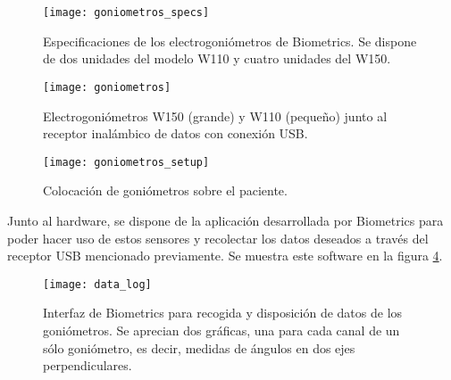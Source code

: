 \begin{figure}[!htb]
\centering
\texttt{[image: goniometros\_specs]}
  \caption{Especificaciones de los electrogoniómetros de Biometrics\cite{goniometros}. Se dispone de dos unidades del modelo W110 y cuatro unidades del W150.}\label{fig:goniometros_specs}
\end{figure}


\begin{figure}[!htb]
\centering
\texttt{[image: goniometros]}
  \caption{Electrogoniómetros W150 (grande) y W110 (pequeño) junto al receptor inalámbico de datos con conexión USB.}\label{fig:goniometros}
\end{figure}


\begin{figure}[!htb]
\centering
\texttt{[image: goniometros\_setup]}
  \caption{Colocación de goniómetros sobre el paciente\cite{goniometros_setup}.}\label{fig:goniometros_setup}
\end{figure}

Junto al hardware, se dispone de la aplicación desarrollada por Biometrics para poder hacer uso de estos sensores y recolectar los datos deseados a través del receptor USB mencionado previamente. Se muestra este software en la figura \ref{fig:data_log}.\\

\begin{figure}[!htb]
\centering
\texttt{[image: data\_log]}
  \caption{Interfaz de Biometrics para recogida y disposición de datos de los goniómetros. Se aprecian dos gráficas, una para cada canal de un sólo goniómetro, es decir, medidas de ángulos en dos ejes perpendiculares.}\label{fig:data_log}
\end{figure}

